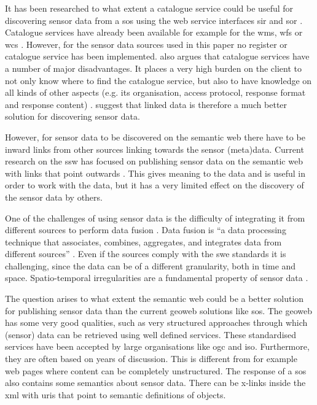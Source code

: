 It has been researched to what extent a catalogue service could be useful for discovering sensor data from a \ac{sos} using the web service interfaces \ac{sir} \citep{SW:OGC3} and \ac{sor} \citep{SW:OGC4}. Catalogue services have already been available for example for the \ac{wms}, \ac{wfs} or \ac{wcs} \citep{SDI:OGC2}. However, for the sensor data sources used in this paper no register or catalogue service has been implemented. \cite{SSW:Atkinson} also argues that catalogue services have a number of major disadvantages. It places a very high burden on the client to not only know where to find the catalogue service, but also to have knowledge on all kinds of other aspects (e.g. its organisation, access protocol, response format and response content) \cite[p. 128]{SSW:Atkinson}. \citeauthor{SSW:Atkinson} suggest that linked data is therefore a much better solution for discovering sensor data. 

However, for sensor data to be discovered on the semantic web there have to be inward links from other sources linking towards the sensor (meta)data. Current research on the \ac{ssw} has focused on publishing sensor data on the semantic web with links that point outwards \citep{SSW:Atkinson, SSW:Janowicz, SSW:Pschorr}. This gives meaning to the data and is useful in order to work with the data, but it has a very limited effect on the discovery of the sensor data by others. 

One of the challenges of using sensor data is the difficulty of integrating it from different sources to perform data fusion \citep{SSW:Corcho, SSW:Ji, SSW:Wang}. Data fusion is \enquote{a data processing technique that associates, combines, aggregates, and integrates data from different sources} \cite[p. 2]{SSW:Wang2}. Even if the sources comply with the \ac{swe} standards it is challenging, since the data can be of a different granularity, both in time and space. Spatio-temporal irregularities are a fundamental property of sensor data \citep{SW:Ganesan}. 

The question arises to what extent the semantic web could be a better solution for publishing sensor data than the current geoweb solutions like \ac{sos}. The geoweb has some very good qualities, such as very structured approaches through which (sensor) data can be retrieved using well defined services. These standardised services have been accepted by large organisations like \ac{ogc} and \ac{iso}. Furthermore, they are often based on years of discussion. This is different from for example web pages where content can be completely unstructured. The response of a \ac{sos} also contains some semantics about sensor data. There can be x-links inside the \ac{xml} with \ac{uri}s that point to semantic definitions of objects. 


